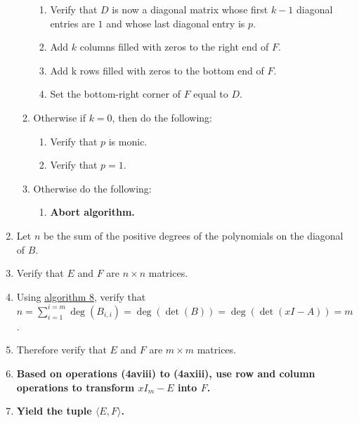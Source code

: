\documentclass[twocolumn]{article}
\begin{document}
\begin{enumerate}
\begin{enumerate}
\begin{enumerate}
						\item Verify that $D$ is now a diagonal matrix whose first $k-1$ diagonal entries are $1$ and whose last diagonal entry is $p$.
						\item Add $k$ columns filled with zeros to the right end of $F$.
						\item Add k rows filled with zeros to the bottom end of $F$.
						\item Set the bottom-right corner of $F$ equal to $D$.
					\end{enumerate}
					\item Otherwise if $k=0$, then do the following:
					\begin{enumerate}
						\item Verify that $p$ is monic.
						\item Verify that $p=1$.
					\end{enumerate}
					\item Otherwise do the following:
					\begin{enumerate}
						\item \textbf{Abort algorithm.}
					\end{enumerate}
				\end{enumerate}
				\item Let $n$ be the sum of the positive degrees of the polynomials on the diagonal of $B$.
				\item Verify that $E$ and $F$ are $n\times n$ matrices.
				\item Using \hyperref[sec:algorithm 8]{algorithm 8}, verify that $n=\sum_{i=1}^{i=m}\deg(B_{i,i})=\deg(\det(B))=\deg(\det(xI-A))=m$.
				\item Therefore verify that $E$ and $F$ are $m\times m$ matrices.
				\item \textbf{Based on operations (4aviii) to (4axiii), use row and column operations to transform $xI_m-E$ into $F$.}
				\item \textbf{Yield the tuple $\langle E, F\rangle$.}
			\end{enumerate}
\end{document}
